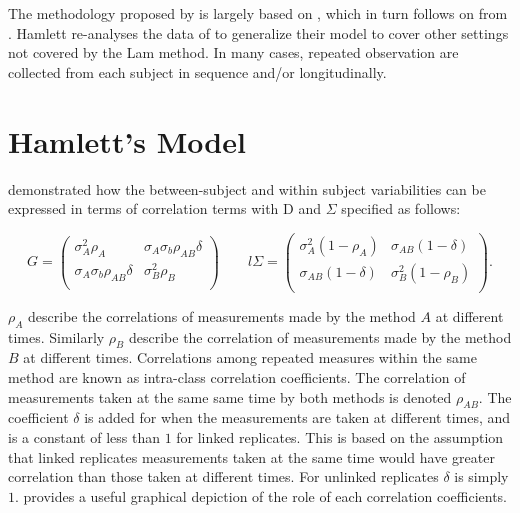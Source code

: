 \documentclass[12pt, a4paper]{report}
\theoremstyle{definition}
\theoremstyle{remark}
\begin{document}
The methodology proposed by \citet{ARoy2009} is largely based on \citet{hamlett}, which in turn follows on from \citet{lam}. Hamlett re-analyses the data of \citet{lam} to generalize their model to cover other settings not covered by the Lam method. In many cases, repeated observation are collected from each subject in sequence  and/or longitudinally.







\section{Hamlett's Model}

\citet{hamlett} demonstrated how the between-subject and within subject variabilities can be expressed in terms of
correlation terms with D and $\Sigma$ specified as follows:

\[
{G} = \left( \begin{array}{cc}
\sigma^2_{A}\rho_{A} & \sigma_{A}\sigma_{b}\rho_{AB}\delta \\
\sigma_{A}\sigma_{b}\rho_{AB}\delta & \sigma^2_{B}\rho_{B}\\

\end{array}\right)
\qquad
l{\Sigma} = \left(
\begin{array}{cc}
\sigma^2_{A}(1-\rho_{A}) & \sigma_{AB}(1-\delta)  \\
\sigma_{AB}(1-\delta) & \sigma^2_{B}(1-\rho_{B}) \\
\end{array}\right).
\]

$\rho_{A}$ describe the correlations of measurements made by the method $A$ at different times. Similarly $\rho_{B}$ describe the correlation of measurements made by the method $B$ at different times. Correlations among repeated measures within the same method are known as intra-class correlation coefficients.  The correlation of measurements taken at the same same time by both methods is denoted $\rho_{AB}$. The coefficient $\delta$ is added for when the measurements are taken at different times, and is a constant of less than $1$ for linked replicates. This is based on the assumption that linked replicates measurements taken at the same time would have greater correlation than those taken at different times. For unlinked replicates $\delta$ is simply $1$. \citet{hamlett} provides a useful graphical depiction of the role of each correlation coefficients.
\end{document}
